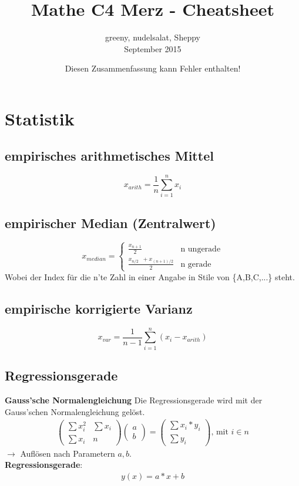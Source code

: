 \documentclass{article}
\title{Mathe C4 Merz - Cheatsheet}
\author{greeny, nudelsalat, Sheppy\\September 2015}
\date{Diesen Zusammenfassung kann Fehler enthalten!}
\begin{document}
\maketitle
\tableofcontents
\newpage
\section{Statistik}
\subsection{empirisches arithmetisches Mittel}
\[x_{arith}=\frac{1}{n}\sum_{i=1}^n x_i\]
\subsection{empirischer Median (Zentralwert)}
\[
	x_{median}=
	\begin{cases}
		\frac{x_{n+1}}{2}								& \text{n ungerade} \\
		\frac{x_{n/2} \;\; + x_{(n+1)/2}}{2}	& \text{n gerade}
	\end{cases}
\]
Wobei der Index f\"ur die n'te Zahl in einer Angabe in Stile von \{A,B,C,...\} steht.
\subsection{empirische korrigierte Varianz}
\[x_{var}=\frac{1}{n-1}\sum_{i=1}^n (x_i-x_{arith})\]
\subsection{Regressionsgerade}
\textbf{Gauss'sche Normalengleichung}
Die Regressionsgerade wird mit der Gauss'schen Normalengleichung gel\"ost.
\begin{align}
	\begin{pmatrix}
		\sum x_i^2 & \sum x_i \\
		\sum x_i   & n
	\end{pmatrix}
	\begin{pmatrix}
		a \\
		b
	\end{pmatrix}
	=
	\begin{pmatrix}
		\sum x_i*y_i \\
		\sum y_i
	\end{pmatrix} \text{, mit $i \in n$}
\end{align}
$\rightarrow$ Auflösen nach Parametern $a,b$.\\
\textbf{Regressionsgerade}:
\begin{align}
	y(x) = a*x + b
\end{align}
\end{document}
